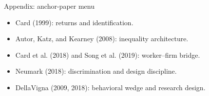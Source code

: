 \documentclass[aspectratio=169,11pt]{beamer}
\begin{document}
\appendix

\begin{frame}{Appendix: anchor-paper menu}
\begin{itemize}
    \item Card (1999): returns and identification.
    \item Autor, Katz, and Kearney (2008): inequality architecture.
    \item Card et al. (2018) and Song et al. (2019): worker--firm bridge.
    \item Neumark (2018): discrimination and design discipline.
    \item DellaVigna (2009, 2018): behavioral wedge and research design.
\end{itemize}
\end{frame}
\end{document}
